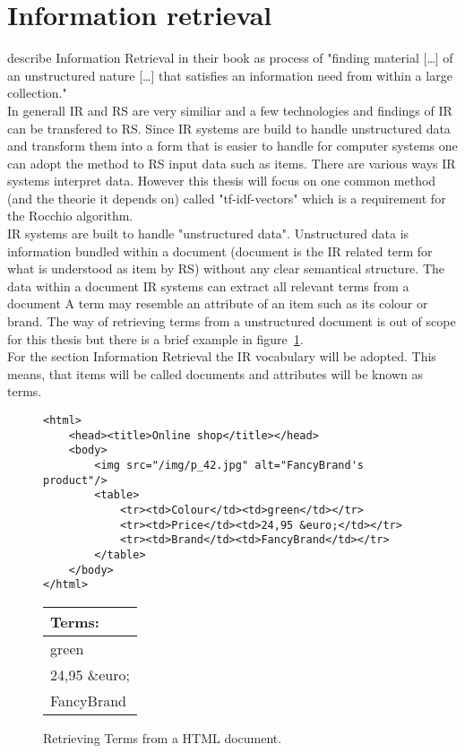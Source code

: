 
\section{Information retrieval}
\iffalse
Was ist Information retrieval
in depth implementation is out of scope
Hinleitung zu Vektoren
\fi
\citeauthor{manning:2009} describe Information Retrieval in their book as process of "finding material [\dots] of an unstructured nature [\dots] that satisfies an information need from within a large collection."\citep[p.~1]{manning:2009}\\
In generall IR and RS are very similiar and a few technologies and findings of IR can be transfered to RS.
Since IR systems are build to handle unstructured data and transform them into a form that is easier to handle for computer systems one can adopt the method to RS input data such as items.\citep[p.~21-23]{ricci:2011}
There are various ways IR systems interpret data.
However this thesis will focus on one common method (and the theorie it depends on) called "tf-idf-vectors" which is a requirement for the Rocchio algorithm.\citep[p.~93]{lops:2011}\\
IR systems are built to handle "unstructured data".
Unstructured data is information bundled within a document (document is the IR related term for what is understood as item by RS) without any clear semantical structure.\citep[p.~1-3]{manning:2009}
The data within a document
IR systems can extract all relevant terms from a document
A term may resemble an attribute of an item such as its colour or brand.
The way of retrieving terms from a unstructured document is out of scope for this thesis but there is a brief example in figure~\ref{fig:TermRetrieving}.\\
For the section Information Retrieval the IR vocabulary will be adopted.
This means, that items will be called documents and attributes will be known as terms.

\begin{figure}[h]
    \center
    \lstset{style=customHTML}
    \begin{lstlisting}
<html>
    <head><title>Online shop</title></head>
    <body>
        <img src="/img/p_42.jpg" alt="FancyBrand's product"/>
        <table>
            <tr><td>Colour</td><td>green</td></tr>
            <tr><td>Price</td><td>24,95 &euro;</td></tr>
            <tr><td>Brand</td><td>FancyBrand</td></tr>
        </table>
    </body>
</html>
    \end{lstlisting}
    \begin{tabular}{ l }
        \textbf{Terms:}\\\hline
        green\\
        24,95 \&euro;\\
        FancyBrand%
    \end{tabular}
    \caption{Retrieving Terms from a HTML document.}
    \label{fig:TermRetrieving}
\end{figure}


